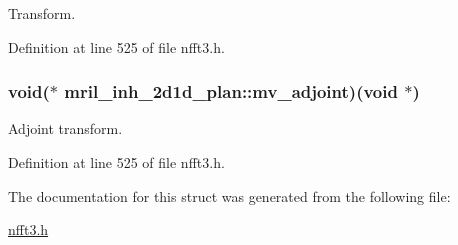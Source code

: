 Transform. 



Definition at line 525 of file nfft3.\-h.

\hypertarget{structmril__inh__2d1d__plan_a6259dd5746b911632df1286d0654eabe}{
\subsubsection[{mv\-\_\-adjoint}]{\setlength{\rightskip}{0pt plus 5cm}void($\ast$ mril\-\_\-inh\-\_\-2d1d\-\_\-plan\-::mv\-\_\-adjoint)(void $\ast$)}}\label{structmril__inh__2d1d__plan_a6259dd5746b911632df1286d0654eabe}


Adjoint transform. 



Definition at line 525 of file nfft3.\-h.



The documentation for this struct was generated from the following file\-:\begin{DoxyCompactItemize}
\item 
\hyperlink{nfft3_8h}{nfft3.\-h}\end{DoxyCompactItemize}
